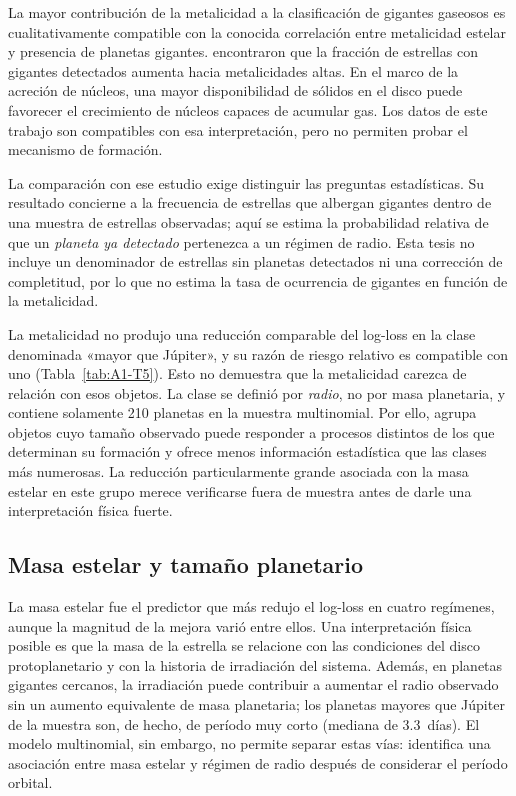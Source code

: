La mayor contribución de la metalicidad a la clasificación de gigantes gaseosos es cualitativamente compatible con la conocida correlación entre metalicidad estelar y presencia de planetas gigantes. \textcite{fischer2005} encontraron que la fracción de estrellas con gigantes detectados aumenta hacia metalicidades altas. En el marco de la acreción de núcleos, una mayor disponibilidad de sólidos en el disco puede favorecer el crecimiento de núcleos capaces de acumular gas. Los datos de este trabajo son compatibles con esa interpretación, pero no permiten probar el mecanismo de formación.

La comparación con ese estudio exige distinguir las preguntas estadísticas. Su resultado concierne a la frecuencia de estrellas que albergan gigantes dentro de una muestra de estrellas observadas; aquí se estima la probabilidad relativa de que un \emph{planeta ya detectado} pertenezca a un régimen de radio. Esta tesis no incluye un denominador de estrellas sin planetas detectados ni una corrección de completitud, por lo que no estima la tasa de ocurrencia de gigantes en función de la metalicidad.

La metalicidad no produjo una reducción comparable del log-loss en la clase denominada «mayor que Júpiter», y su razón de riesgo relativo es compatible con uno (Tabla~\ref{tab:A1-T5}). Esto no demuestra que la metalicidad carezca de relación con esos objetos. La clase se definió por \emph{radio}, no por masa planetaria, y contiene solamente 210 planetas en la muestra multinomial. Por ello, agrupa objetos cuyo tamaño observado puede responder a procesos distintos de los que determinan su formación y ofrece menos información estadística que las clases más numerosas. La reducción particularmente grande asociada con la masa estelar en este grupo merece verificarse fuera de muestra antes de darle una interpretación física fuerte.

\subsection{Masa estelar y tamaño planetario}
\label{sec:dis-masa-estelar-tamano}

La masa estelar fue el predictor que más redujo el log-loss en cuatro regímenes, aunque la magnitud de la mejora varió entre ellos. Una interpretación física posible es que la masa de la estrella se relacione con las condiciones del disco protoplanetario y con la historia de irradiación del sistema. Además, en planetas gigantes cercanos, la irradiación puede contribuir a aumentar el radio observado sin un aumento equivalente de masa planetaria; los planetas mayores que Júpiter de la muestra son, de hecho, de período muy corto (mediana de 3.3~días). El modelo multinomial, sin embargo, no permite separar estas vías: identifica una asociación entre masa estelar y régimen de radio después de considerar el período orbital.

